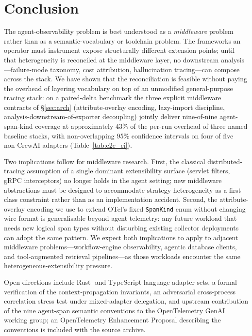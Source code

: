 \documentclass[sigconf,review,anonymous,9pt]{acmart}
\begin{document}
\section{Conclusion}

The agent-observability problem is best understood as a
\emph{middleware} problem rather than as a semantic-vocabulary or
toolchain problem. The frameworks an operator must instrument expose
structurally different extension points; until that heterogeneity is
reconciled at the middleware layer, no downstream
analysis---failure-mode taxonomy, cost attribution, hallucination
tracing---can compose across the stack. We have shown that the
reconciliation is feasible without paying the overhead of layering
vocabulary on top of an unmodified general-purpose tracing stack: on
a paired-delta benchmark the three explicit middleware contracts of
\S\ref{sec:arch} (attribute-overlay encoding, lazy-import discipline,
analysis-downstream-of-exporter decoupling) jointly deliver
nine-of-nine agent-span-kind coverage at approximately 43\% of the
per-run overhead of three named baseline stacks, with non-overlapping
95\% confidence intervals on four of five non-CrewAI adapters
(Table~\ref{tab:e2e_ci}).

Two implications follow for middleware research. First, the
classical distributed-tracing assumption of a single dominant
extensibility surface (servlet filters, gRPC interceptors) no longer
holds in the agent setting; new middleware abstractions must be
designed to accommodate strategy heterogeneity as a first-class
constraint rather than as an implementation accident. Second, the
attribute-overlay encoding we use to extend OTel's fixed
\texttt{SpanKind} enum without changing wire format is generalisable
beyond agent telemetry: any future workload that needs new logical
span types without disturbing existing collector deployments can adopt
the same pattern. We expect both implications to apply to adjacent
middleware problems---workflow-engine observability, agentic database
clients, and tool-augmented retrieval pipelines---as those workloads
encounter the same heterogeneous-extensibility pressure.

Open directions include Rust- and TypeScript-language adapter sets,
a formal verification of the context-propagation invariants, an
adversarial cross-process correlation stress test under mixed-adapter
delegation, and upstream contribution of the nine agent-span
semantic conventions to the OpenTelemetry GenAI working group; an
OpenTelemetry Enhancement Proposal describing the conventions is
included with the source archive.

\balance


\end{document}
